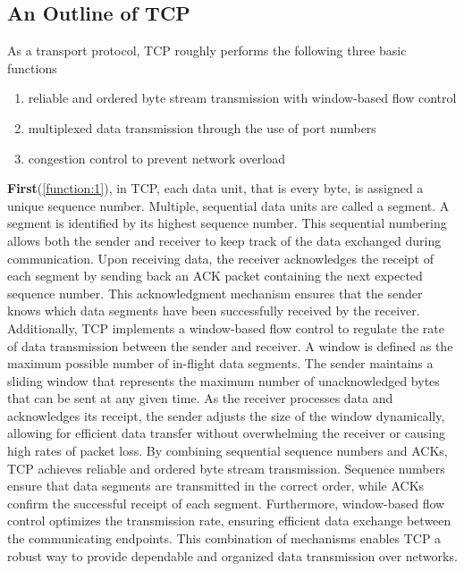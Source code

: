 \subsection{An Outline of TCP}

As a transport protocol, TCP roughly performs the following three basic functions
\begingroup
\renewcommand\labelenumi{(\theenumi)}
\begin{enumerate}
\item reliable and ordered byte stream transmission with window-based flow control \label{function:1}
\item multiplexed data transmission through the use of port numbers \label{function:2}
\item congestion control to prevent network overload \label{function:3}
\end{enumerate}
\endgroup

\textbf{First}(\ref{function:1}), in TCP, each data unit, that is every byte, is assigned a unique sequence number. Multiple,
sequential data units are called a segment. A segment is identified by its highest sequence number. This sequential numbering
allows both the sender and receiver to keep track of the data exchanged during communication. Upon receiving data, the receiver
acknowledges the receipt of each segment by sending back an ACK packet containing the next expected sequence number. This
acknowledgment mechanism ensures that the sender knows which data segments have been successfully received by the
receiver. Additionally, TCP implements a window-based flow control to regulate the rate of data transmission between the sender
and receiver. A window is defined as the maximum possible number of in-flight data segments. The sender maintains a sliding
window that represents the maximum number of unacknowledged bytes that can be sent at any given time. As the receiver processes
data and acknowledges its receipt, the sender adjusts the size of the window dynamically, allowing for efficient data transfer
without overwhelming the receiver or causing high rates of packet loss. By combining sequential sequence numbers and ACKs, TCP
achieves reliable and ordered byte stream transmission. Sequence numbers ensure that data segments
are transmitted in the correct order, while ACKs confirm the successful receipt of each segment. Furthermore, window-based
flow control optimizes the transmission rate, ensuring efficient data exchange between the communicating endpoints. This
combination of mechanisms enables TCP a robust way to provide dependable and organized data transmission over networks.

